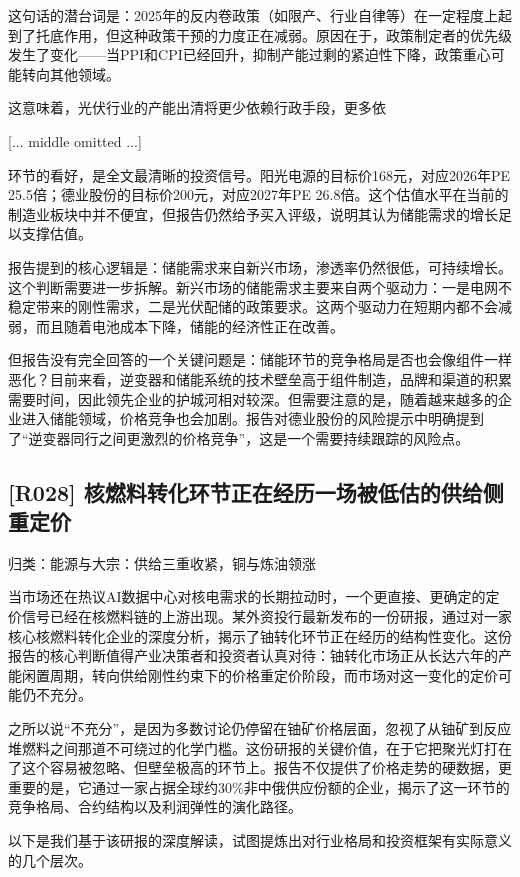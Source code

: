 \documentclass[11pt]{ctexart}
\begin{document}
这句话的潜台词是：2025年的反内卷政策（如限产、行业自律等）在一定程度上起到了托底作用，但这种政策干预的力度正在减弱。原因在于，政策制定者的优先级发生了变化——当PPI和CPI已经回升，抑制产能过剩的紧迫性下降，政策重心可能转向其他领域。

这意味着，光伏行业的产能出清将更少依赖行政手段，更多依

[... middle omitted ...]

环节的看好，是全文最清晰的投资信号。阳光电源的目标价168元，对应2026年PE 25.5倍；德业股份的目标价200元，对应2027年PE 26.8倍。这个估值水平在当前的制造业板块中并不便宜，但报告仍然给予买入评级，说明其认为储能需求的增长足以支撑估值。

报告提到的核心逻辑是：储能需求来自新兴市场，渗透率仍然很低，可持续增长。这个判断需要进一步拆解。新兴市场的储能需求主要来自两个驱动力：一是电网不稳定带来的刚性需求，二是光伏配储的政策要求。这两个驱动力在短期内都不会减弱，而且随着电池成本下降，储能的经济性正在改善。

但报告没有完全回答的一个关键问题是：储能环节的竞争格局是否也会像组件一样恶化？目前来看，逆变器和储能系统的技术壁垒高于组件制造，品牌和渠道的积累需要时间，因此领先企业的护城河相对较深。但需要注意的是，随着越来越多的企业进入储能领域，价格竞争也会加剧。报告对德业股份的风险提示中明确提到了“逆变器同行之间更激烈的价格竞争”，这是一个需要持续跟踪的风险点。

\subsection{[R028] 核燃料转化环节正在经历一场被低估的供给侧重定价}
{\small\color{refgray}归类：能源与大宗：供给三重收紧，铜与炼油领涨}

当市场还在热议AI数据中心对核电需求的长期拉动时，一个更直接、更确定的定价信号已经在核燃料链的上游出现。某外资投行最新发布的一份研报，通过对一家核心核燃料转化企业的深度分析，揭示了铀转化环节正在经历的结构性变化。这份报告的核心判断值得产业决策者和投资者认真对待：铀转化市场正从长达六年的产能闲置周期，转向供给刚性约束下的价格重定价阶段，而市场对这一变化的定价可能仍不充分。

之所以说“不充分”，是因为多数讨论仍停留在铀矿价格层面，忽视了从铀矿到反应堆燃料之间那道不可绕过的化学门槛。这份研报的关键价值，在于它把聚光灯打在了这个容易被忽略、但壁垒极高的环节上。报告不仅提供了价格走势的硬数据，更重要的是，它通过一家占据全球约30\%非中俄供应份额的企业，揭示了这一环节的竞争格局、合约结构以及利润弹性的演化路径。

以下是我们基于该研报的深度解读，试图提炼出对行业格局和投资框架有实际意义的几个层次。
\end{document}
